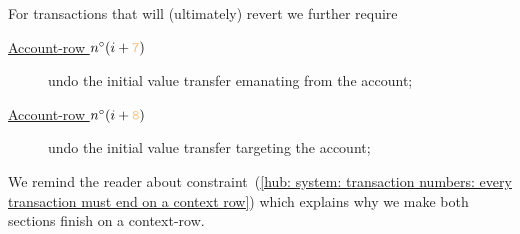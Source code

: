 For transactions that will (ultimately) revert we further require
\begin{description}
	\item[\underline{Account-row $n^\circ(i + \roffTxInitAccUndoingSenderValueTransfer     )$}] undo the initial value transfer emanating from the  account;
	\item[\underline{Account-row $n^\circ(i + \roffTxInitAccUndoingRecipientValueReception )$}] undo the initial value transfer targeting the  account;
\end{description}

\saNote{}
We remind the reader about
constraint~(\ref{hub: system: transaction numbers: every transaction must end on a context row})
which explains why we make both sections finish on a context-row.
